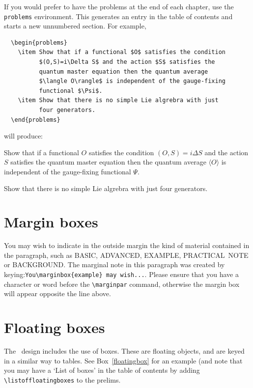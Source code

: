 If you would prefer to have the problems at the end of each chapter, use the \verb"problems" environment. This generates an entry in the table of contents and starts a new unnumbered section. For example,
\begin{verbatim}
  \begin{problems}
    \item Show that if a functional $O$ satisfies the condition
          $(O,S)=i\Delta S$ and the action $S$ satisfies the
          quantum master equation then the quantum average
          $\langle O\rangle$ is independent of the gauge-fixing
          functional $\Psi$.
    \item Show that there is no simple Lie algrebra with just
          four generators.
  \end{problems}
\end{verbatim}
will produce:
  \begin{problems}
    \item Show that if a functional $O$ satisfies the condition
          $(O,S)=i\Delta S$ and the action $S$ satisfies the
          quantum master equation then the quantum average
          $\langle O\rangle$ is independent of the gauge-fixing
          functional $\Psi$.
    \item Show that there is no simple Lie algrebra with just
          four generators.
  \end{problems}

\section{Margin boxes}

You may wish to indicate in the outside margin the kind of material contained in the paragraph, such as \hbox{BASIC}, \hbox{ADVANCED}, \hbox{EXAMPLE}, \hbox{PRACTICAL NOTE} or \hbox{BACKGROUND}. The marginal note in this paragraph was created by keying:\linebreak \verb"You\marginbox{example} may wish...". Please ensure that you have a character or word before the \verb"\marginpar" command, otherwise the margin box will appear opposite the line above.

\section{Floating boxes}

The \cambridge\ design includes the use of boxes. These are floating objects, and are keyed in a similar way to tables. See Box~\ref{floatingbox} for an example (and note that you may have a `List of boxes' in the table of contents by adding \verb"\listoffloatingboxes" to the prelims.

